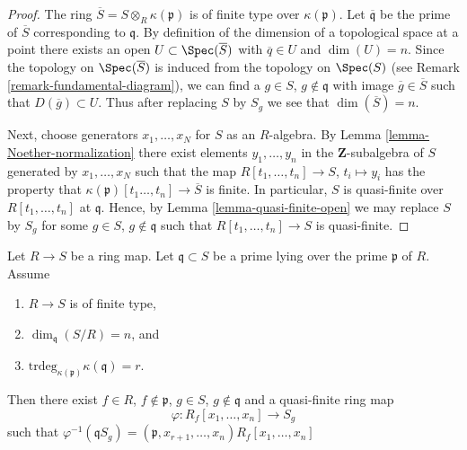\begin{proof}
The ring $\overline{S} = S \otimes_R \kappa(\mathfrak p)$ is
of finite type over $\kappa(\mathfrak p)$.
Let $\overline{\mathfrak q}$ be the prime of $\overline{S}$
corresponding to $\mathfrak q$.
By definition of
the dimension of a topological space at a point there exists
an open $U \subset \Spec(\overline{S})$ with
$\overline{q} \in U$ and $\dim(U) = n$.
Since the topology on $\Spec(\overline{S})$ is
induced from the topology on $\Spec(S)$ (see
Remark \ref{remark-fundamental-diagram}), we can find
a $g \in S$, $g \not \in \mathfrak q$ with image
$\overline{g} \in \overline{S}$ such that
$D(\overline{g}) \subset U$.
Thus after replacing $S$ by $S_g$ we see that
$\dim(\overline{S}) = n$.

\medskip\noindent
Next, choose generators $x_1, \ldots, x_N$ for $S$ as an $R$-algebra. By
Lemma \ref{lemma-Noether-normalization}
there exist elements $y_1, \ldots, y_n$ in the $\mathbf{Z}$-subalgebra of $S$
generated by $x_1, \ldots, x_N$ such that the map
$R[t_1, \ldots, t_n] \to S$, $t_i \mapsto y_i$ has the property
that $\kappa(\mathfrak p)[t_1\ldots, t_n] \to \overline{S}$
is finite. In particular, $S$ is quasi-finite over $R[t_1, \ldots, t_n]$
at $\mathfrak q$. Hence, by Lemma \ref{lemma-quasi-finite-open}
we may replace $S$ by $S_g$ for some $g\in S$, $g \not \in \mathfrak q$
such that $R[t_1, \ldots, t_n] \to S$ is quasi-finite.
\end{proof}

\begin{lemma}
\label{lemma-refined-quasi-finite-over-polynomial-algebra}
Let $R \to S$ be a ring map. Let $\mathfrak q \subset S$
be a prime lying over the prime $\mathfrak p$ of $R$.
Assume
\begin{enumerate}
\item $R \to S$ is of finite type,
\item $\dim_{\mathfrak q}(S/R) = n$, and
\item $\text{trdeg}_{\kappa(\mathfrak p)}\kappa(\mathfrak q) = r$.
\end{enumerate}
Then there exist $f \in R$, $f \not \in \mathfrak p$,
$g \in S$, $g \not\in \mathfrak q$ and a quasi-finite ring map
$$
\varphi : R_f[x_1, \ldots, x_n] \longrightarrow S_g
$$
such that $\varphi^{-1}(\mathfrak qS_g) =
(\mathfrak p, x_{r + 1}, \ldots, x_n)R_f[x_1, \ldots, x_n]$
\end{lemma}

